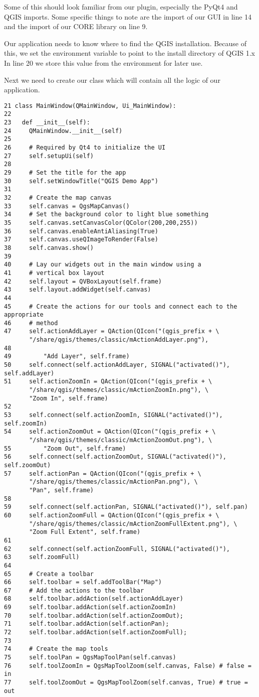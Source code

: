 Some of this should look familiar from our plugin, especially the PyQt4 and
QGIS imports. Some specific things to note are the import of our GUI in line
14 and the import of our CORE library on line 9.

Our application needs to know where to find the QGIS installation. Because
of this, we set the  environment variable to point to the 
install directory of QGIS 1.x In line 20 we store this value from
the environment for later use.

Next we need to create our  class which will contain
all the logic of our application.
\begin{verbatim}
21 class MainWindow(QMainWindow, Ui_MainWindow):
22 
23   def __init__(self):
24     QMainWindow.__init__(self)
25 
26     # Required by Qt4 to initialize the UI
27     self.setupUi(self)
28 
29     # Set the title for the app
30     self.setWindowTitle("QGIS Demo App")
31 
32     # Create the map canvas
33     self.canvas = QgsMapCanvas()
34     # Set the background color to light blue something
35     self.canvas.setCanvasColor(QColor(200,200,255))
36     self.canvas.enableAntiAliasing(True)
37     self.canvas.useQImageToRender(False)
38     self.canvas.show()
39 
40     # Lay our widgets out in the main window using a 
41     # vertical box layout
42     self.layout = QVBoxLayout(self.frame)
43     self.layout.addWidget(self.canvas)
44 
45     # Create the actions for our tools and connect each to the appropriate
46     # method
47     self.actionAddLayer = QAction(QIcon("(qgis_prefix + \
       "/share/qgis/themes/classic/mActionAddLayer.png"),
48
49         "Add Layer", self.frame)
50     self.connect(self.actionAddLayer, SIGNAL("activated()"), self.addLayer)
51     self.actionZoomIn = QAction(QIcon("(qgis_prefix + \
       "/share/qgis/themes/classic/mActionZoomIn.png"), \
       "Zoom In", self.frame)
52     
53     self.connect(self.actionZoomIn, SIGNAL("activated()"), self.zoomIn)
54     self.actionZoomOut = QAction(QIcon("(qgis_prefix + \
       "/share/qgis/themes/classic/mActionZoomOut.png"), \
55         "Zoom Out", self.frame)
56     self.connect(self.actionZoomOut, SIGNAL("activated()"), self.zoomOut)
57     self.actionPan = QAction(QIcon("(qgis_prefix + \
       "/share/qgis/themes/classic/mActionPan.png"), \
       "Pan", self.frame)
58
59     self.connect(self.actionPan, SIGNAL("activated()"), self.pan)
60     self.actionZoomFull = QAction(QIcon("(qgis_prefix + \
       "/share/qgis/themes/classic/mActionZoomFullExtent.png"), \
       "Zoom Full Extent", self.frame)
61
62     self.connect(self.actionZoomFull, SIGNAL("activated()"),
63     self.zoomFull)
64 
65     # Create a toolbar
66     self.toolbar = self.addToolBar("Map")
67     # Add the actions to the toolbar
68     self.toolbar.addAction(self.actionAddLayer)
69     self.toolbar.addAction(self.actionZoomIn)
70     self.toolbar.addAction(self.actionZoomOut);
71     self.toolbar.addAction(self.actionPan);
72     self.toolbar.addAction(self.actionZoomFull);
73 
74     # Create the map tools
75     self.toolPan = QgsMapToolPan(self.canvas)
76     self.toolZoomIn = QgsMapToolZoom(self.canvas, False) # false = in
77     self.toolZoomOut = QgsMapToolZoom(self.canvas, True) # true = out
\end{verbatim}

